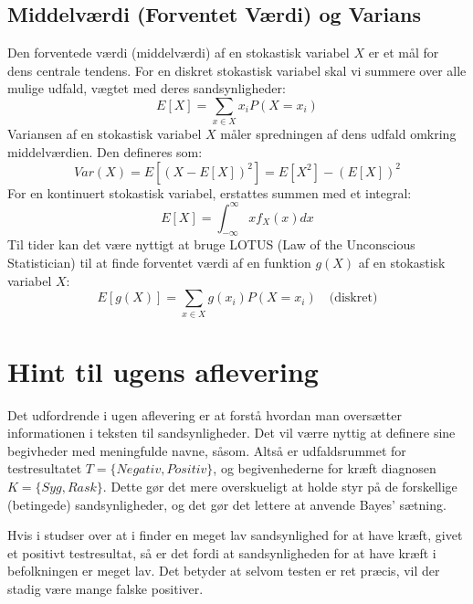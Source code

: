 \documentclass{article}
\begin{document}
\subsection*{Middelværdi (Forventet Værdi) og Varians}
Den forventede værdi (middelværdi) af en stokastisk variabel $X$ er et mål for dens centrale tendens. For en diskret stokastisk variabel skal vi summere over alle mulige udfald, vægtet med deres sandsynligheder:
\begin{equation}
E[X] = \sum_{x \in X} x_i P(X = x_i)
\end{equation}
Variansen af en stokastisk variabel $X$ måler spredningen af dens udfald omkring middelværdien. Den defineres som:
\begin{equation}
Var(X) = E[(X - E[X])^2] = E[X^2] - (E[X])^2
\end{equation}
For en kontinuert stokastisk variabel, erstattes summen med et integral:
\begin{equation}
E[X] = \int_{-\infty}^{\infty} x f_X(x) dx
\end{equation}
Til tider kan det være nyttigt at bruge LOTUS (Law of the Unconscious Statistician) til at finde forventet værdi af en funktion $g(X)$ af en stokastisk variabel $X$:
\begin{equation}
E[g(X)] = \sum_{x \in X} g(x_i) P(X = x_i) \quad \text{(diskret)}
\end{equation}

\section*{Hint til ugens aflevering}
Det udfordrende i ugen aflevering er at forstå hvordan man oversætter informationen i teksten til sandsynligheder. Det vil værre nyttig at definere sine begivheder med meningfulde navne, såsom. Altså er udfaldsrummet for testresultatet $T = \{Negativ, Positiv\}$, og begivenhederne for kræft diagnosen $K = \{Syg, Rask\}$. Dette gør det mere overskueligt at holde styr på de forskellige (betingede) sandsynligheder, og det gør det lettere at anvende Bayes' sætning. \vspace{1em}

Hvis i studser over at i finder en meget lav sandsynlighed for at have kræft, givet et positivt testresultat, så er det fordi at sandsynligheden for at have kræft i befolkningen er meget lav. Det betyder at selvom testen er ret præcis, vil der stadig være mange falske positiver. \vspace{1em}
\end{document}
